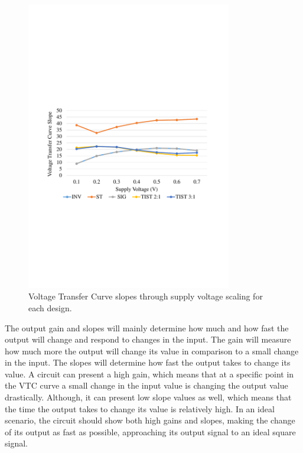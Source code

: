 \documentclass[diss,pgmicro,english]{iiufrgs}
\begin{document}
    \begin{figure}[h]
        \centering
            \includegraphics[width=0.8\textwidth, trim={1.25cm 9cm 2cm 10cm}, clip]{slopes.pdf}
            \caption{Voltage Transfer Curve slopes through supply voltage scaling for each design.}
        \label{fig:slopes}
    \end{figure}

The output gain and slopes will mainly determine how much and how fast the output will change and respond to changes in the input. The gain will measure how much more the output will change its value in comparison to a small change in the input. The slopes will determine how fast the output takes to change its value. A circuit can present a high gain, which means that at a specific point in the VTC curve a small change in the input value is changing the output value drastically. Although, it can present low slope values as well, which means that the time the output takes to change its value is relatively high. In an ideal scenario, the circuit should show both high gains and slopes, making the change of its output as fast as possible, approaching its output signal to an ideal square signal.
\end{document}

